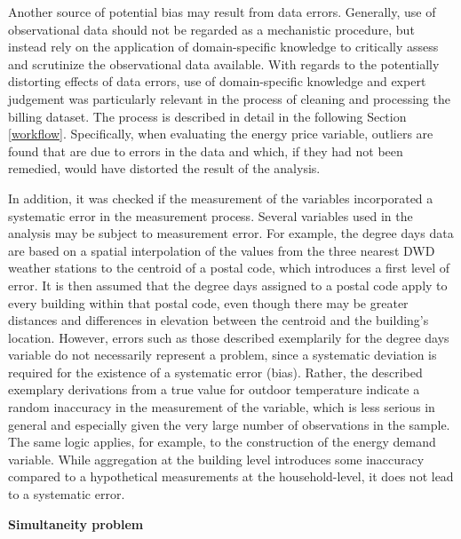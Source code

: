 \documentclass[12pt,twoside]{reedthesis}
\begin{document}
Another source of potential bias may result from data errors. Generally, use of observational data should not be regarded as a mechanistic procedure, but instead rely on the application of domain-specific knowledge to critically assess and scrutinize the observational data available. With regards to the potentially distorting effects of data errors, use of domain-specific knowledge and expert judgement was particularly relevant in the process of cleaning and processing the billing dataset. The process is described in detail in the following Section \ref{workflow}. Specifically, when evaluating the energy price variable, outliers are found that are due to errors in the data and which, if they had not been remedied, would have distorted the result of the analysis.

In addition, it was checked if the measurement of the variables incorporated a systematic error in the measurement process. Several variables used in the analysis may be subject to measurement error. For example, the degree days data are based on a spatial interpolation of the values from the three nearest DWD weather stations to the centroid of a postal code, which introduces a first level of error. It is then assumed that the degree days assigned to a postal code apply to every building within that postal code, even though there may be greater distances and differences in elevation between the centroid and the building's location. However, errors such as those described exemplarily for the degree days variable do not necessarily represent a problem, since a systematic deviation is required for the existence of a systematic error (bias). Rather, the described exemplary derivations from a true value for outdoor temperature indicate a random inaccuracy in the measurement of the variable, which is less serious in general and especially given the very large number of observations in the sample. The same logic applies, for example, to the construction of the energy demand variable. While aggregation at the building level introduces some inaccuracy compared to a hypothetical measurements at the household-level, it does not lead to a systematic error.

\textbf{Simultaneity problem}
\end{document}
